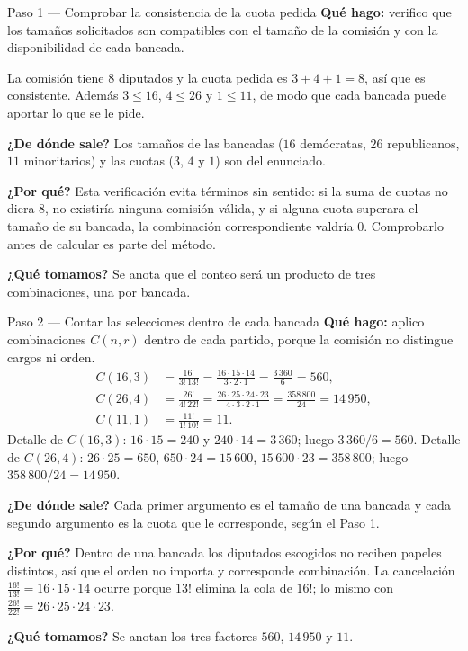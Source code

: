 \documentclass[11pt]{article}
\begin{document}
\begin{paso}{Paso 1 --- Comprobar la consistencia de la cuota pedida}
\textbf{Qué hago:} verifico que los tamaños solicitados son compatibles con el tamaño de la comisión y con la disponibilidad de cada bancada.

La comisión tiene $8$ diputados y la cuota pedida es $3+4+1=8$, así que es consistente. Además $3\le 16$, $4\le 26$ y $1\le 11$, de modo que cada bancada puede aportar lo que se le pide.

\textbf{¿De dónde sale?} Los tamaños de las bancadas ($16$ demócratas, $26$ republicanos, $11$ minoritarios) y las cuotas ($3$, $4$ y $1$) son del enunciado.

\textbf{¿Por qué?} Esta verificación evita términos sin sentido: si la suma de cuotas no diera $8$, no existiría ninguna comisión válida, y si alguna cuota superara el tamaño de su bancada, la combinación correspondiente valdría $0$. Comprobarlo antes de calcular es parte del método.

\textbf{¿Qué tomamos?} Se anota que el conteo será un producto de tres combinaciones, una por bancada.
\end{paso}

\begin{paso}{Paso 2 --- Contar las selecciones dentro de cada bancada}
\textbf{Qué hago:} aplico combinaciones $C(n,r)$ dentro de cada partido, porque la comisión no distingue cargos ni orden.
\begin{align*}
  C(16,3)&=\frac{16!}{3!\,13!}=\frac{16\cdot 15\cdot 14}{3\cdot 2\cdot 1}=\frac{3\,360}{6}=560,\\
  C(26,4)&=\frac{26!}{4!\,22!}=\frac{26\cdot 25\cdot 24\cdot 23}{4\cdot 3\cdot 2\cdot 1}=\frac{358\,800}{24}=14\,950,\\
  C(11,1)&=\frac{11!}{1!\,10!}=11 .
\end{align*}
Detalle de $C(16,3)$: $16\cdot 15=240$ y $240\cdot 14=3\,360$; luego $3\,360/6=560$. Detalle de $C(26,4)$: $26\cdot 25=650$, $650\cdot 24=15\,600$, $15\,600\cdot 23=358\,800$; luego $358\,800/24=14\,950$.

\textbf{¿De dónde sale?} Cada primer argumento es el tamaño de una bancada y cada segundo argumento es la cuota que le corresponde, según el Paso 1.

\textbf{¿Por qué?} Dentro de una bancada los diputados escogidos no reciben papeles distintos, así que el orden no importa y corresponde combinación. La cancelación $\frac{16!}{13!}=16\cdot 15\cdot 14$ ocurre porque $13!$ elimina la cola de $16!$; lo mismo con $\frac{26!}{22!}=26\cdot 25\cdot 24\cdot 23$.

\textbf{¿Qué tomamos?} Se anotan los tres factores $560$, $14\,950$ y $11$.
\end{paso}
\end{document}
